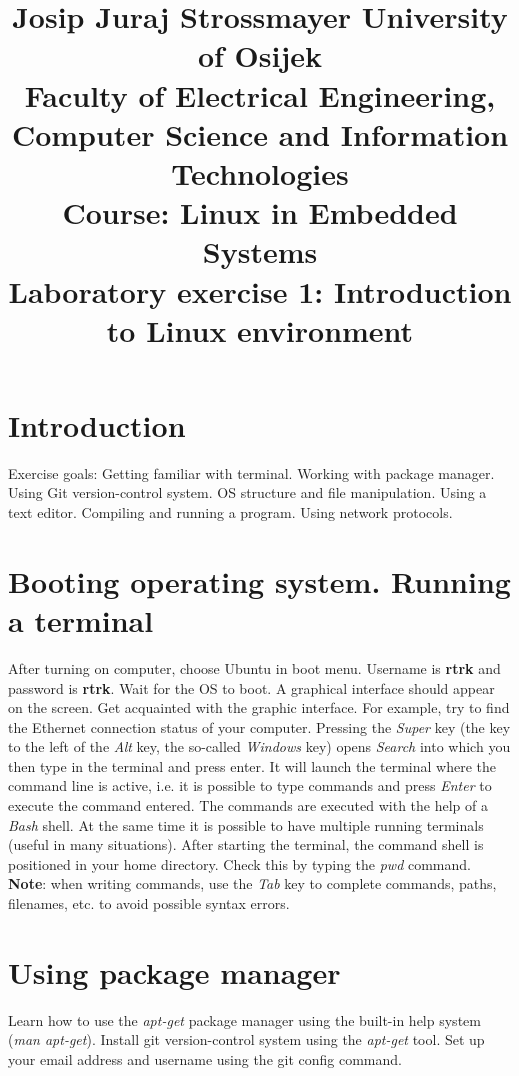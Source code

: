\documentclass[11pt]{article}
\title{
	\Large Josip Juraj Strossmayer University of Osijek \\
	Faculty of Electrical Engineering, Computer Science and Information
	 Technologies\\
	\vspace{4cm}
	\Large Course: Linux in Embedded Systems \\
	\vspace{4cm}
	\Large \textbf{Laboratory exercise 1: Introduction to Linux environment}
	}
\date{}
\begin{document}
\maketitle
\thispagestyle{empty}
\newpage

\section{Introduction}
Exercise goals: Getting familiar with terminal. Working with package manager.
 Using Git version-control system. OS structure and file manipulation.
 Using a text editor. Compiling and running a program. Using network protocols.

\section{Booting operating system. Running a terminal}
After turning on computer, choose Ubuntu in boot menu. Username is
 \textbf{rtrk} and password is \textbf{rtrk}. Wait for the OS to boot.
 A graphical interface should appear on the screen. Get acquainted with the
 graphic interface. For example, try to find the Ethernet connection status
 of your computer.
 \newline
 \newline
 Pressing the \textit{Super} key (the key to the left of the \textit{Alt} key,
 the so-called \textit{Windows} key) opens \textit{Search} into which you then
 type in the terminal and press enter. It will launch the terminal where the
 command line is active, i.e. it is possible to type commands and press
 \textit{Enter} to execute the command entered. The commands are executed with
 the help of a \textit{Bash} shell. At the same time it is possible to have
 multiple running terminals (useful in many situations). After starting the
 terminal, the command shell is positioned in your home directory. Check this
 by typing the \textit{pwd} command.
\newline
\newline
\textbf{Note}: when writing commands, use the \textit{Tab} key to complete
commands, paths, filenames, etc. to avoid possible syntax errors.

\section{Using package manager}
Learn how to use the \textit{apt-get} package manager using the built-in
 help system (\textit{man apt-get}). Install git version-control system using
 the \textit{apt-get} tool. Set up your email address and username
using the git config command.
\end{document}

